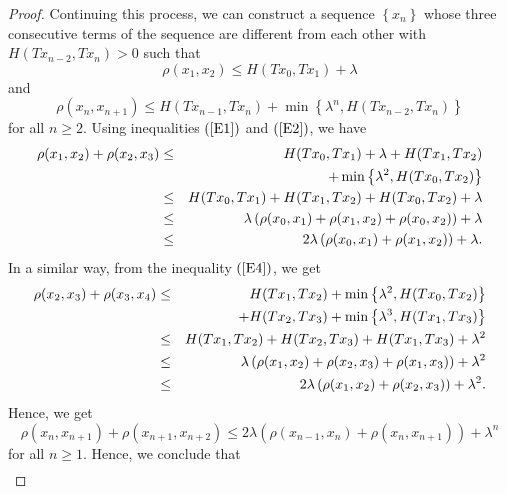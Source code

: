 \documentclass[reqno,11pt]{amsart}
\theoremstyle{plain}
\numberwithin{equation}{section}
\begin{document}
\begin{proof}
Continuing this process, we can construct a sequence $\left \{
x_{n}\right
\} $ whose three consecutive terms of the sequence are
different from each other with $H\left( Tx_{n-2},Tx_{n}\right) >0$ such that%
\begin{equation*}
\rho (x_{1},x_{2})\leq H(Tx_{0},Tx_{1})+\lambda
\end{equation*}%
and 
\begin{equation}
\rho (x_{n},x_{n+1})\leq H(Tx_{n-1},Tx_{n})+\min \left \{ \lambda
^{n},H(Tx_{n-2},Tx_{n})\right \}  \label{E4}
\end{equation}%
for all $n\geq 2$. Using inequalities $\left( \ref{E1}\right) $ and $\left( %
\ref{E2}\right) $, we have 
\begin{eqnarray}
\rho (x_{1},x_{2})+\rho (x_{2},x_{3}) &\leq &H(Tx_{0},Tx_{1})+\lambda
+H(Tx_{1},Tx_{2})  \notag \\
&&+\min \left \{ \lambda ^{2},H(Tx_{0},Tx_{2})\right \}  \notag \\
&\leq &H(Tx_{0},Tx_{1})+H(Tx_{1},Tx_{2})+H(Tx_{0},Tx_{2})+\lambda  \notag \\
&\leq &\lambda \left( \rho (x_{0},x_{1})+\rho (x_{1},x_{2})+\rho
(x_{0},x_{2})\right) +\lambda  \notag \\
&\leq &2\lambda \left( \rho (x_{0},x_{1})+\rho (x_{1},x_{2})\right) +\lambda
.  \label{E6}
\end{eqnarray}%
In a similar way, from the inequality $\left( \ref{E4}\right) $, we get%
\begin{eqnarray}
\rho (x_{2},x_{3})+\rho (x_{3},x_{4}) &\leq &H(Tx_{1},Tx_{2})+\min \left \{
\lambda ^{2},H(Tx_{0},Tx_{2})\right \}  \notag \\
&&+H(Tx_{2},Tx_{3})+\min \left \{ \lambda ^{3},H(Tx_{1},Tx_{3})\right \} 
\notag \\
&\leq &H(Tx_{1},Tx_{2})+H(Tx_{2},Tx_{3})+H(Tx_{1},Tx_{3})+\lambda ^{2} 
\notag \\
&\leq &\lambda \left( \rho (x_{1},x_{2})+\rho (x_{2},x_{3})+\rho
(x_{1},x_{3})\right) +\lambda ^{2}  \notag \\
&\leq &2\lambda \left( \rho (x_{1},x_{2})+\rho (x_{2},x_{3})\right) +\lambda
^{2}.  \label{E7}
\end{eqnarray}%
Hence, we get 
\begin{equation*}
\rho (x_{n},x_{n+1})+\rho (x_{n+1},x_{n+2})\leq 2\lambda \left( \rho
(x_{n-1},x_{n})+\rho (x_{n},x_{n+1})\right) +\lambda ^{n}
\end{equation*}%
for all $n\geq 1$. Hence, we conclude that 
\begin{eqnarray*}

\end{eqnarray*}
\end{proof}
\end{document}
